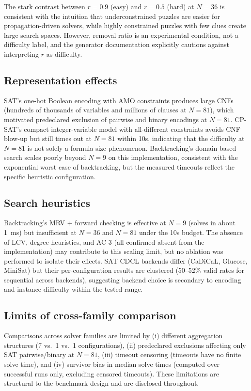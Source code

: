 \documentclass[a4paper,fleqn]{cas-sc}
\begin{document}
The stark contrast between \(r=0.9\) (easy) and \(r=0.5\) (hard) at \(N=36\) is consistent with the intuition that underconstrained puzzles are easier for propagation-driven solvers, while highly constrained puzzles with few clues create large search spaces. However, removal ratio is an experimental condition, not a difficulty label, and the generator documentation explicitly cautions against interpreting \(r\) as difficulty.

\subsection{Representation effects}

SAT's one-hot Boolean encoding with AMO constraints produces large CNFs (hundreds of thousands of variables and millions of clauses at \(N=81\)), which motivated predeclared exclusion of pairwise and binary encodings at \(N=81\). CP-SAT's compact integer-variable model with all-different constraints avoids CNF blow-up but still times out at \(N=81\) within 10s, indicating that the difficulty at \(N=81\) is not solely a formula-size phenomenon. Backtracking's domain-based search scales poorly beyond \(N=9\) on this implementation, consistent with the exponential worst case of backtracking, but the measured timeouts reflect the specific heuristic configuration.

\subsection{Search heuristics}

Backtracking's MRV + forward checking is effective at \(N=9\) (solves in about 1~ms) but insufficient at \(N=36\) and \(N=81\) under the 10s budget. The absence of LCV, degree heuristics, and AC-3 (all confirmed absent from the implementation) may contribute to this scaling limit, but no ablation was performed to isolate their effects. SAT CDCL backends differ (CaDiCaL, Glucose, MiniSat) but their per-configuration results are clustered (50--52\% valid rates for sequential across backends), suggesting backend choice is secondary to encoding and instance difficulty within the tested range.

\subsection{Limits of cross-family comparison}

Comparisons across solver families are limited by (i) different aggregation structures (7 vs.\ 1 vs.\ 1 configurations), (ii) predeclared exclusions affecting only SAT pairwise/binary at \(N=81\), (iii) timeout censoring (timeouts have no finite solve time), and (iv) survivor bias in median solve times (computed over successful runs only, excluding censored timeouts). These limitations are structural to the benchmark design and are disclosed throughout.
\end{document}

